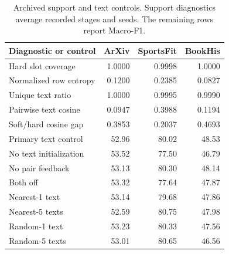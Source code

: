 \begin{table}[H]
\centering
\scriptsize
\setlength{\tabcolsep}{2pt}
\caption{Archived support and text controls. Support diagnostics average
recorded stages and seeds. The remaining rows report Macro-F1.}
\label{tab:compact_text}
\begin{tabular*}{\linewidth}{@{\extracolsep{\fill}}lrrr@{}}
\toprule
Diagnostic or control & ArXiv & SportsFit & BookHis\\
\midrule
Hard slot coverage & 1.0000 & 0.9998 & 1.0000\\
Normalized row entropy & 0.1200 & 0.2385 & 0.0827\\
Unique text ratio & 1.0000 & 0.9995 & 0.9990\\
Pairwise text cosine & 0.0947 & 0.3988 & 0.1194\\
Soft/hard cosine gap & 0.3853 & 0.2037 & 0.4693\\
\midrule
Primary text control & 52.96 & 80.02 & 48.53\\
No text initialization & 53.52 & 77.50 & 46.79\\
No pair feedback & 53.13 & 80.30 & 48.14\\
Both off & 53.32 & 77.64 & 47.87\\
\midrule
Nearest-1 text & 53.14 & 79.68 & 47.86\\
Nearest-5 texts & 52.59 & 80.75 & 47.98\\
Random-1 text & 53.23 & 80.33 & 47.56\\
Random-5 texts & 53.01 & 80.65 & 46.56\\
\bottomrule
\end{tabular*}
\end{table}

\endgroup
